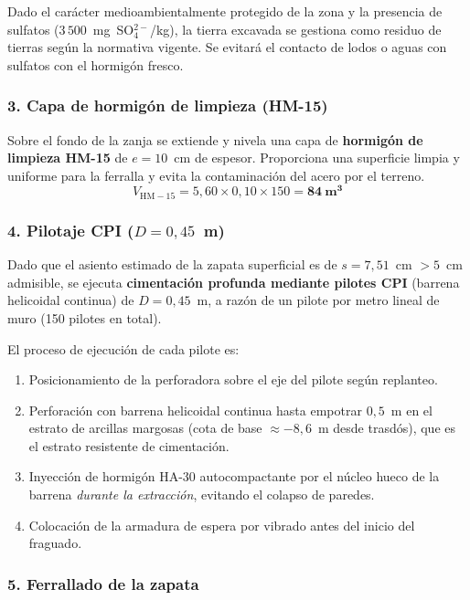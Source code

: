 \begin{notabox}
  Dado el carácter medioambientalmente protegido de la zona y la presencia de
  sulfatos ($3\,500$~mg~SO${}_4^{2-}$/kg), la tierra excavada se gestiona como
  residuo de tierras según la normativa vigente. Se evitará el contacto de
  lodos o aguas con sulfatos con el hormigón fresco.
\end{notabox}

\subsubsection*{3. Capa de hormigón de limpieza (HM-15)}

Sobre el fondo de la zanja se extiende y nivela una capa de
\textbf{hormigón de limpieza HM-15} de $e = 10$~cm de espesor. Proporciona
una superficie limpia y uniforme para la ferralla y evita la contaminación del
acero por el terreno.
\[
  V_{\mathrm{HM-15}} = 5{,}60 \times 0{,}10 \times 150 = \mathbf{84~\text{m}^3}
\]

\subsubsection*{4. Pilotaje CPI ($D = 0{,}45$~m)}

Dado que el asiento estimado de la zapata superficial es de $s = 7{,}51$~cm
$> 5$~cm admisible, se ejecuta \textbf{cimentación profunda mediante pilotes
CPI} (barrena helicoidal continua) de $D = 0{,}45$~m, a razón de un pilote
por metro lineal de muro (150 pilotes en total).

El proceso de ejecución de cada pilote es:
\begin{enumerate}
  \item Posicionamiento de la perforadora sobre el eje del pilote según replanteo.
  \item Perforación con barrena helicoidal continua hasta empotrar $0{,}5$~m
        en el estrato de arcillas margosas (cota de base $\approx -8{,}6$~m desde
        trasdós), que es el estrato resistente de cimentación.
  \item Inyección de hormigón HA-30 autocompactante por el núcleo hueco de
        la barrena \emph{durante la extracción}, evitando el colapso de paredes.
  \item Colocación de la armadura de espera por vibrado antes del inicio del
        fraguado.
\end{enumerate}

\subsubsection*{5. Ferrallado de la zapata}

